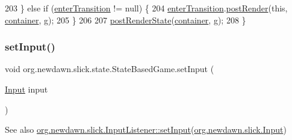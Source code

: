 \begin{DoxyCode}
203         \} \textcolor{keywordflow}{else} \textcolor{keywordflow}{if} (\mbox{\hyperlink{classorg_1_1newdawn_1_1slick_1_1state_1_1_state_based_game_a85aa7a1bf06d60e2143e5ba002d9088a}{enterTransition}} != null) \{
204             \mbox{\hyperlink{classorg_1_1newdawn_1_1slick_1_1state_1_1_state_based_game_a85aa7a1bf06d60e2143e5ba002d9088a}{enterTransition}}.\mbox{\hyperlink{interfaceorg_1_1newdawn_1_1slick_1_1state_1_1transition_1_1_transition_ac113f4d5a19962a62a8adec7f9ab5d47}{postRender}}(\textcolor{keyword}{this}, \mbox{\hyperlink{classorg_1_1newdawn_1_1slick_1_1state_1_1_state_based_game_a538846600436175cbed48450adfdd025}{container}}, g);
205         \}
206         
207         \mbox{\hyperlink{classorg_1_1newdawn_1_1slick_1_1state_1_1_state_based_game_af5ecc0b6b725fb12bfe005e6310a9bc3}{postRenderState}}(\mbox{\hyperlink{classorg_1_1newdawn_1_1slick_1_1state_1_1_state_based_game_a538846600436175cbed48450adfdd025}{container}}, g);
208     \}
\end{DoxyCode}
\mbox{\label{classorg_1_1newdawn_1_1slick_1_1state_1_1_state_based_game_a0d9931474b8c383d9cbf3026fc3a9c07}} 
\subsubsection{\texorpdfstring{set\+Input()}{setInput()}}
{\footnotesize\ttfamily void org.\+newdawn.\+slick.\+state.\+State\+Based\+Game.\+set\+Input (\begin{DoxyParamCaption}\item[{\mbox{\hyperlink{classorg_1_1newdawn_1_1slick_1_1_input}{Input}}}]{input }\end{DoxyParamCaption})\hspace{0.3cm}{\ttfamily [inline]}}

\begin{DoxySeeAlso}{See also}
\mbox{\hyperlink{interfaceorg_1_1newdawn_1_1slick_1_1_controlled_input_reciever_ab838ca221a429b05c0b53aea9b4fe72f}{org.\+newdawn.\+slick.\+Input\+Listener\+::set\+Input}}(\mbox{\hyperlink{classorg_1_1newdawn_1_1slick_1_1_input}{org.\+newdawn.\+slick.\+Input}}) 
\end{DoxySeeAlso}


